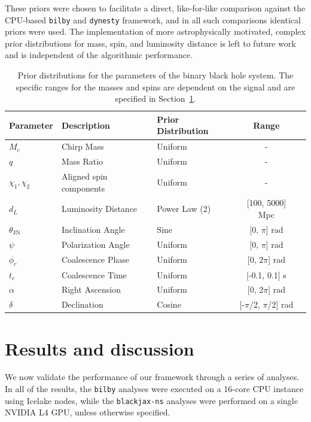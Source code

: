 \documentclass[fleqn,usenatbib]{mnras}
\begin{document}
These priors were chosen to facilitate a direct, like-for-like
comparison against the CPU-based \texttt{bilby} and \texttt{dynesty}
framework, and in all such comparisons identical priors were used. The
implementation of more astrophysically motivated, complex prior
distributions for mass, spin, and luminosity distance is left to
future work and is independent of the algorithmic performance.

\begin{table}
\setlength{\tabcolsep}{3pt} %
\centering
\caption{Prior distributions for the parameters of the binary black hole
system. The specific ranges for the masses and spins
 are dependent on the signal and are specified in Section~\ref{sec:results}.}
\label{tab:priors}
\begin{tabular}{l l l c c}
\hline
\hline
\textbf{Parameter} & \textbf{Description} & \textbf{Prior Distribution} & \textbf{Range}\\
\hline
$M_c$ & Chirp Mass & Uniform & - \\
$q$ & Mass Ratio & Uniform & - \\
$\chi_1, \chi_2$ & Aligned spin components & Uniform & - \\
$d_L$ & Luminosity Distance & Power Law (2) & [100, 5000] Mpc \\
$\theta_{\textrm{JN}}$ & Inclination Angle & Sine & [0, $\pi$] rad \\
$\psi$ & Polarization Angle & Uniform & [0, $\pi$] rad \\
$\phi_c$ & Coalescence Phase & Uniform & [0, 2$\pi$] rad \\
$t_c$ & Coalescence Time & Uniform & [-0.1, 0.1] s\\
$\alpha$ & Right Ascension & Uniform & [0, 2$\pi$] rad \\
$\delta$ & Declination & Cosine & [-$\pi$/2, $\pi$/2] rad \\
\hline
\hline
\end{tabular}
\end{table}


\section{Results and discussion}
\label{sec:results}

We now validate the performance of our framework through a series of
analyses. In all of the results, the \texttt{bilby} analyses
were executed on a 16-core CPU instance using Icelake nodes, while the \texttt{blackjax-ns}
analyses were performed on a single NVIDIA L4 GPU, unless otherwise specified.
\end{document}
